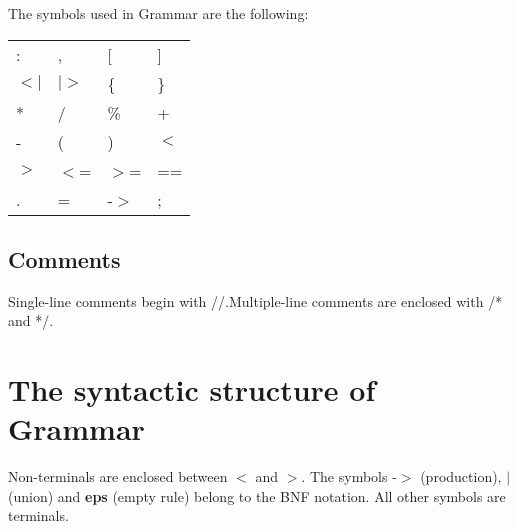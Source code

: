 \documentclass{article}
\begin{document}
The symbols used in Grammar are the following:

\begin{center}\begin{tabular}{llll}
: & , & [ & ] \\
$<$$|$ & $|$$>$ & \{ & \} \\
* & / & \% & + \\
- & ( & ) & $<$ \\
$>$ & $<$= & $>$= & == \\
. & = & -$>$ & ; \\
\end{tabular}\end{center}

\subsection{Comments}

Single-line comments begin with //.Multiple-line comments are  enclosed with /* and */.

\section{The syntactic structure of Grammar}

Non-terminals are enclosed between $<$ and $>$.
The symbols -$>$ (production),  \textbf{$|$}  (union)
and \textbf{eps} (empty rule) belong to the BNF notation.
All other symbols are terminals. \\
\end{document}
